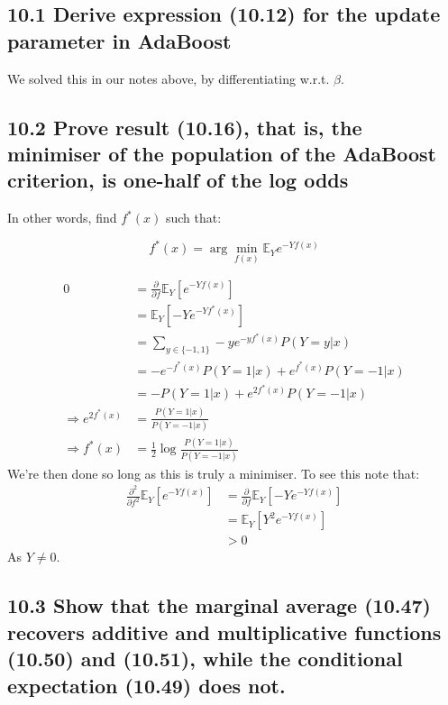 \subsection*{10.1 Derive expression (10.12) for the update parameter in AdaBoost}
We solved this in our notes above, by differentiating w.r.t. $\beta$.

\subsection*{10.2 Prove result (10.16), that is, the minimiser of the population of the AdaBoost criterion, is one-half of the log odds}

In other words, find $f^*(x)$ such that:

$$ f^*(x) = \arg\min_{f(x)} \mathbb{E}_Y e^{-Yf(x)}$$

\begin{align*}
    0 &= \frac{\partial}{\partial f}  \mathbb{E}_Y \left[e^{-Yf(x)}\right]\\
    &=   \mathbb{E}_Y \left[-Ye^{-Yf^*(x)}\right]\\
    &=   \sum_{y \in \{-1, 1\}} -ye^{-yf^*(x)} P(Y = y \vert x) \\
    &=   -e^{-f^*(x)} P(Y = 1 \vert x) + e^{f^*(x)} P(Y = -1 \vert x) \\
    &=   -P(Y = 1 \vert x) + e^{2 f^*(x)} P(Y = -1 \vert x) \\
    \Rightarrow e^{2 f^*(x)} &= \frac{P(Y = 1 \vert x)}{P(Y = -1 \vert x) }\\
    \Rightarrow f^*(x) &= \frac{1}{2} \log \frac{P(Y = 1 \vert x)}{P(Y = -1 \vert x) }
\end{align*}
We're then done so long as this is truly a minimiser. To see this note that:
\begin{align*}
     \frac{\partial^2}{\partial f^2}  \mathbb{E}_Y \left[e^{-Yf(x)}\right] &= \frac{\partial}{\partial f} \mathbb{E}_Y \left[-Ye^{-Yf(x)}\right] \\
     &=  \mathbb{E}_Y \left[Y^2 e^{-Yf(x)}\right] \\
     &> 0
\end{align*}
As $Y \neq 0$.

\subsection*{10.3 Show that the marginal average (10.47) recovers additive and multiplicative functions (10.50) and (10.51), while the conditional expectation (10.49) does not.}

